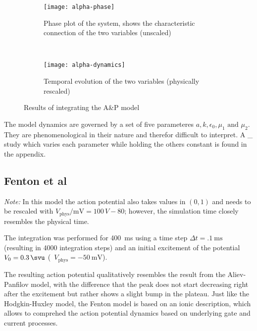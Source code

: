 \begin{figure}[h]
    \centering
    \begin{subfigure}[b]{.45\textwidth}
        \texttt{[image: alpha-phase]}
        \vspace{-\baselineskip}
        \label{fig:alphaphase}
        \caption{Phase plot of the system, shows the characteristic connection
        of the two variables (unscaled)}
    \end{subfigure}
    ~
    \begin{subfigure}[b]{.45\textwidth}
        \texttt{[image: alpha-dynamics]}
        \vspace{-\baselineskip}
        \label{fig:alphadyn}
        \caption{Temporal evolution of the two variables (physically rescaled)}
    \end{subfigure}
    \label{fig:alpha1}
    \caption{Results of integrating the A\&P model}
\end{figure}

The model dynamics are governed by a set of five parameteres $a, k, \epsilon_0,
\mu_1\text{ and }\mu_2$. They are phenomenological in their nature and therefor
difficult to interpret. A \_ study which varies each
parameter while holding the others constant is found in the appendix.


\subsection{Fenton et al}
\emph{Note:} In this model the action potential also takes values in $(0,1)$
and needs to be rescaled with $V_{\mathrm{phys}}/\si{\milli\volt}=100\,V-80$;
however, the simulation time closely resembles the physical time.

\vspace{\baselineskip}
The integration was performed for \SI{400}{\milli\second} using a time step
$\Delta{t}=\SI{.1}{\milli\second}$ (resulting in 4000 integration steps) and
an initial excitement of the potential $V_0=\SI{.3}{\svu}$
(\ie~$V_{\mathrm{phys}}=\SI{-50}{\milli\volt}$).

The resulting action potential qualitatively resembles the result from the
Aliev-Panfilov model, with the difference that the peak does not start
decreasing right after the excitement but rather shows a slight bump in the
plateau.
Just like the Hodgkin-Huxley model, the Fenton model is  based on an ionic
description, which allows to comprehed the action potential dynamics based on
underlying gate and current processes.

